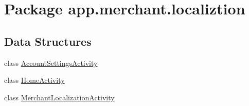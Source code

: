 \hypertarget{namespaceapp_1_1merchant_1_1localiztion}{\section{Package app.\-merchant.\-localiztion}
\label{namespaceapp_1_1merchant_1_1localiztion}
}
\subsection*{Data Structures}
\begin{DoxyCompactItemize}
\item 
class \hyperlink{classapp_1_1merchant_1_1localiztion_1_1_account_settings_activity}{Account\-Settings\-Activity}
\item 
class \hyperlink{classapp_1_1merchant_1_1localiztion_1_1_home_activity}{Home\-Activity}
\item 
class \hyperlink{classapp_1_1merchant_1_1localiztion_1_1_merchant_localization_activity}{Merchant\-Localization\-Activity}
\end{DoxyCompactItemize}
